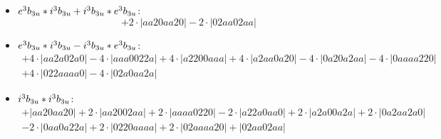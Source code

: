 \documentclass{article}
\begin{document}
\begin{itemize}
$$\begin{array}{c}
\end{array}$$
\item \boldmath$e^3 b_{3u} * i^3 b_{3u} + i^3 b_{3u} * e^3 b_{3u} \displaystyle $\unboldmath : \quad$$+2 \cdot \left|aa20aa20\right| -2 \cdot \left|02aa02aa\right|$$
\item \boldmath$e^3 b_{3u} * i^3 b_{3u} - i^3 b_{3u} * e^3 b_{3u} \displaystyle $\unboldmath : \quad$$\begin{array}{c}
+4 \cdot \left|aa2a02a0\right| -4 \cdot \left|aaa0022a\right| +4 \cdot \left|a2200aaa\right| +4 \cdot \left|a2aa0a20\right| -4 \cdot \left|0a20a2aa\right| -4 \cdot \left|0aaaa220\right| \\[0.5cm] +4 \cdot \left|022aaaa0\right| -4 \cdot \left|02a0aa2a\right|
\end{array}$$
\item \boldmath$i^3 b_{3u} * i^3 b_{3u} \displaystyle $\unboldmath : \quad$$\begin{array}{c}
+\left|aa20aa20\right| +2 \cdot \left|aa2002aa\right| +2 \cdot \left|aaaa0220\right| -2 \cdot \left|a22a0aa0\right| +2 \cdot \left|a2a00a2a\right| +2 \cdot \left|0a2aa2a0\right| \\[0.5cm] -2 \cdot \left|0aa0a22a\right| +2 \cdot \left|0220aaaa\right| +2 \cdot \left|02aaaa20\right| +\left|02aa02aa\right|
\end{array}$$

\end{itemize}
\end{document}
